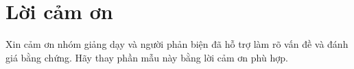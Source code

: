 \chapter*{Lời cảm ơn}
Xin cảm ơn nhóm giảng dạy và người phản biện đã hỗ trợ làm rõ vấn đề và đánh giá bằng chứng. Hãy thay phần mẫu này bằng lời cảm ơn phù hợp.

